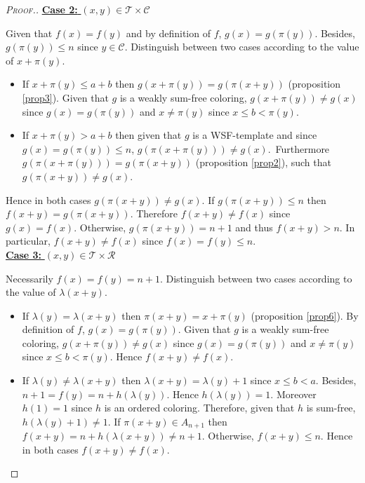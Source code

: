 \begin{proof}[\textsc{Proof.}]
\noindent \underline{\textbf{Case 2:} \((x,y) \in \mathcal{T} \times \mathcal{C}\)}
\par
Given that \(f(x) = f(y)\) and by definition of \(f\), \(g(x) = g(\pi(y))\). Besides, \(g(\pi(y)) \leqslant n\) since 
\(y \in \mathcal{C}\). Distinguish between two cases according to the value of \(x + \pi(y)\).
\begin{itemize}
\item \begin{sloppypar}
	If \(x + \pi(y) \leqslant a + b\) then \(g(x + \pi(y)) = g(\pi(x + y))\) (proposition \ref{prop3}). Given that \(g\) is 
	a weakly sum-free coloring, \(g(x+\pi(y)) \neq g(x)\) since \(g(x)=g(\pi(y))\) and \(x \neq \pi(y)\) since
	\({x \leqslant b < \pi(y)}\).
	\end{sloppypar}
\item \begin{sloppypar}
	If \(x+\pi(y)> a+b\) then given that \(g\) is a WSF-template and since \({g(x) = g(\pi(y)) \leqslant n}\), 
	\({g(\pi(x+\pi(y))) \neq g(x)}\).~Furthermore \({g(\pi(x+\pi(y))) = g(\pi(x+y))}\) (proposition \ref{prop2}), such that 
	\({g(\pi(x+ y)) \neq g(x)}\).
	\end{sloppypar}
\end{itemize}
\par
Hence in both cases \(g(\pi(x+y)) \neq g(x)\). If  \(g(\pi(x+y)) \leqslant n\) then \(f(x+y) = g(\pi(x+y))\). Therefore 
\(f(x+y) \neq f(x)\) since \(g(x) = f(x)\). Otherwise, \(g(\pi(x+y)) = n + 1\) and thus \(f(x+y) > n\). In particular, 
\(f(x + y) \neq f(x)\) since \(f(x) = f(y) \leqslant n\). \\

\noindent \underline{\textbf{Case 3:} \((x,y) \in \mathcal{T} \times \mathcal{R}\)}
\par
Necessarily \(f(x) = f(y) = n + 1\). Distinguish between two cases according to the value of \(\lambda(x+y)\).
\begin{itemize}
\item If \(\lambda(y)=\lambda(x+y)\) then \(\pi(x + y) = x + \pi(y)\) (proposition \ref{prop6}). By definition of 
	\(f\), \(g(x) = g(\pi(y))\). Given that \(g\) is a weakly sum-free coloring, \(g(x + \pi(y)) \neq g(x)\) since 
	\(g(x) = g(\pi(y))\) and \(x \neq \pi(y)\) since \({x \leqslant b < \pi(y)}\). Hence \(f(x + y) \neq f(x)\).
\item If \(\lambda(y) \neq \lambda(x + y)\) then \(\lambda(x + y) = \lambda(y) + 1\) since \(x \leqslant b < a\). 
	Besides, \(n + 1 = f(y) = n +  h(\lambda(y))\). Hence \(h(\lambda(y)) = 1\). Moreover \(h(1) = 1\) since \(h\) 
	is an ordered coloring. Therefore, given that \(h\) is sum-free, \(h(\lambda(y) + 1) \neq 1\). If \(\pi(x + y) \in 
	A_{n + 1}\) then \(f(x + y) = n + h(\lambda(x + y)) \neq n + 1\). Otherwise, \(f(x + y) \leqslant n\). Hence 
	in both cases \(f(x + y) \neq f(x)\).
\end{itemize}


\end{proof}
